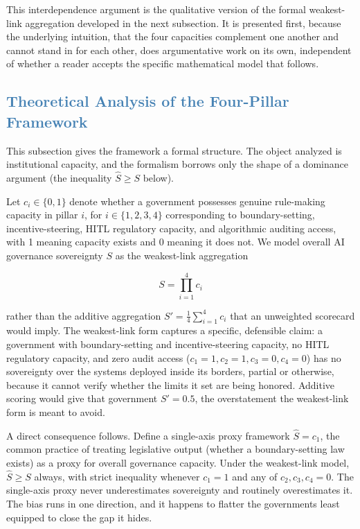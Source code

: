 \documentclass[journal]{IEEEtran}
\begin{document}
This interdependence argument is the qualitative version of the formal weakest-link aggregation developed in the next subsection. It is presented first, because the underlying intuition, that the four capacities complement one another and cannot stand in for each other, does argumentative work on its own, independent of whether a reader accepts the specific mathematical model that follows.

\subsection{\textcolor{steelblue}{Theoretical Analysis of the Four-Pillar Framework}}

This subsection gives the framework a formal structure. The object analyzed is institutional capacity, and the formalism borrows only the shape of a dominance argument (the inequality $\hat{S} \ge S$ below).

Let $c_i \in \{0,1\}$ denote whether a government possesses genuine rule-making capacity in pillar $i$, for $i \in \{1,2,3,4\}$ corresponding to boundary-setting, incentive-steering, HITL regulatory capacity, and algorithmic auditing access, with 1 meaning capacity exists and 0 meaning it does not. We model overall AI governance sovereignty $S$ as the weakest-link aggregation

\begin{equation}
S = \prod_{i=1}^{4} c_i
\label{eq:sovereignty}
\end{equation}

\noindent rather than the additive aggregation $S' = \tfrac{1}{4}\sum_{i=1}^{4} c_i$ that an unweighted scorecard would imply. The weakest-link form captures a specific, defensible claim: a government with boundary-setting and incentive-steering capacity, no HITL regulatory capacity, and zero audit access ($c_1=1, c_2=1, c_3=0, c_4=0$) has no sovereignty over the systems deployed inside its borders, partial or otherwise, because it cannot verify whether the limits it set are being honored. Additive scoring would give that government $S' = 0.5$, the overstatement the weakest-link form is meant to avoid.

A direct consequence follows. Define a single-axis proxy framework $\hat{S} = c_1$, the common practice of treating legislative output (whether a boundary-setting law exists) as a proxy for overall governance capacity. Under the weakest-link model, $\hat{S} \ge S$ always, with strict inequality whenever $c_1 = 1$ and any of $c_2, c_3, c_4 = 0$. The single-axis proxy never underestimates sovereignty and routinely overestimates it. The bias runs in one direction, and it happens to flatter the governments least equipped to close the gap it hides.
\end{document}
